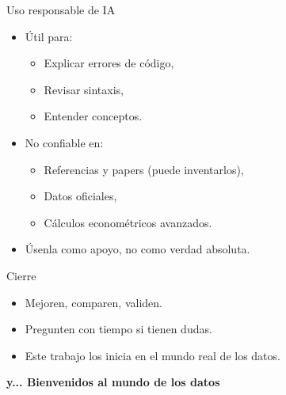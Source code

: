 \documentclass[aspectratio=169,10pt]{beamer}
\begin{document}
\begin{frame}{Uso responsable de IA}
  \begin{itemize}
    \item Útil para:
      \begin{itemize}
        \item Explicar errores de código,
        \item Revisar sintaxis,
        \item Entender conceptos.
      \end{itemize}
    \item No confiable en:
      \begin{itemize}
        \item Referencias y papers (puede inventarlos),
        \item Datos oficiales,
        \item Cálculos econométricos avanzados.
      \end{itemize}
    \item Úsenla como apoyo, no como verdad absoluta.
  \end{itemize}
\end{frame}

\begin{frame}{Cierre}
  \begin{itemize}
    \item Mejoren, comparen, validen.
    \item Pregunten con tiempo si tienen dudas.
    \item Este trabajo los inicia en el mundo real de los datos.
  \end{itemize}
  \vfill
  \begin{center}
    {\Large \textbf{\color{UdeCBlue}y... Bienvenidos al mundo de los datos}}
  \end{center}
\end{frame}

\end{document}
